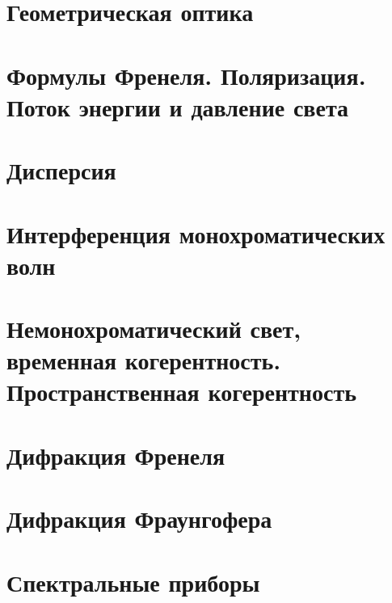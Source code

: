 \maketitle
\newpage

\section{Геометрическая оптика}






\section{Формулы Френеля. Поляризация. Поток энергии и давление света}



%

\section{Дисперсия}



%

\section{Интерференция монохроматических волн}





\section{Немонохроматический свет, временная когерентность. Пространственная когерентность}



%

\section{Дифракция Френеля}



%

\section{Дифракция Фраунгофера}



%

\section{Спектральные приборы}


%
%

